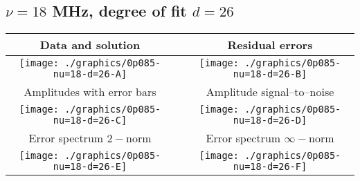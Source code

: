 

% 

\clearpage{}
\break{}

\subsection{$\nu = 18$ MHz, degree of fit $d = 26$}

\begin{table}[h]
    \begin{center}
        \begin{tabular}{ccc}
            Data and solution & \quad & Residual errors \\\hline
            \texttt{[image: ./graphics/0p085-nu=18-d=26-A]} &&
            \texttt{[image: ./graphics/0p085-nu=18-d=26-B]} \\[15pt]
            Amplitudes with error bars && Amplitude signal--to--noise \\\hline
            \texttt{[image: ./graphics/0p085-nu=18-d=26-C]} &&
            \texttt{[image: ./graphics/0p085-nu=18-d=26-D]} \\[15pt]
            Error spectrum $2-$norm && Error spectrum $\infty-$norm \\\hline
            \texttt{[image: ./graphics/0p085-nu=18-d=26-E]} &&
            \texttt{[image: ./graphics/0p085-nu=18-d=26-F]} \\[15pt]
        \end{tabular}
    \end{center}
\label{fig:elev=85, nu=18}
\end{table}



\endinput
